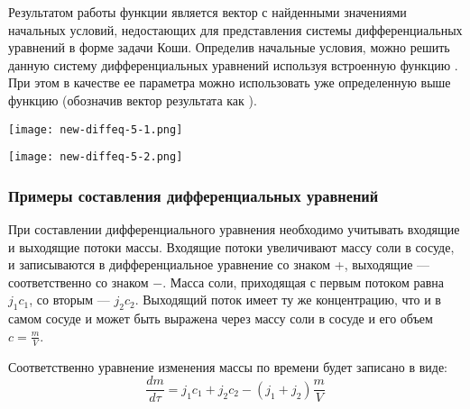 Результатом работы функции  является вектор с найденными значениями начальных условий, недостающих для представления системы дифференциальных уравнений в форме задачи Коши. Определив начальные условия, можно решить данную систему дифференциальных уравнений используя встроенную функцию .  При этом  в качестве  ее параметра  можно использовать уже определенную выше функцию  (обозначив вектор результата как ).

\begin{center}
	\texttt{[image: new-diffeq-5-1.png]}
\end{center}

\begin{center}
	\texttt{[image: new-diffeq-5-2.png]}
\end{center}

\subsubsection*{Примеры составления дифференциальных уравнений}

При составлении дифференциального уравнения необходимо учитывать входящие и выходящие потоки массы. Входящие потоки увеличивают массу соли в сосуде, и записываются в дифференциальное уравнение со знаком +, выходящие --- соответственно со знаком $-$. Масса соли, приходящая с первым потоком равна $j_1 c_1$, со вторым --- $j_2 c_2$. Выходящий поток имеет ту же концентрацию, что и в самом сосуде и может быть выражена через массу соли в сосуде и его объем $c=\frac{m}{V}$.

Соответственно уравнение изменения массы по времени будет записано в виде:
\begin{equation}
\dfrac{d m}{d \tau} = j_1 c_1 + j_2 c_2 - (j_1 + j_2 ) \dfrac{m}{V}
\end{equation}

